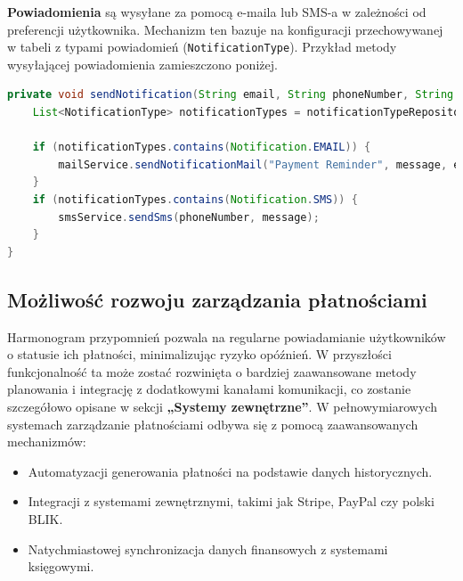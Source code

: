 \noindent \textbf{Powiadomienia} są wysyłane za pomocą e-maila lub SMS-a w zależności od preferencji użytkownika. Mechanizm ten bazuje na konfiguracji przechowywanej w tabeli z typami powiadomień (\texttt{NotificationType}).
Przykład metody wysyłającej powiadomienia zamieszczono poniżej.
\begin{lstlisting}[language=Java, style=JavaStyle, caption=Wysyłanie powiadomień]
private void sendNotification(String email, String phoneNumber, String message) {
    List<NotificationType> notificationTypes = notificationTypeRepository.findByUserEmail(email);

    if (notificationTypes.contains(Notification.EMAIL)) {
        mailService.sendNotificationMail("Payment Reminder", message, email);
    }
    if (notificationTypes.contains(Notification.SMS)) {
        smsService.sendSms(phoneNumber, message);
    }
}
\end{lstlisting}

\subsection{Możliwość rozwoju zarządzania płatnościami}
Harmonogram przypomnień pozwala na regularne powiadamianie użytkowników o statusie ich płatności, minimalizując ryzyko opóźnień. W przyszłości funkcjonalność ta może zostać rozwinięta o bardziej zaawansowane metody planowania i integrację z dodatkowymi kanałami komunikacji, co zostanie szczegółowo opisane w sekcji \textbf{„Systemy zewnętrzne”}. W pełnowymiarowych systemach zarządzanie płatnościami odbywa się z pomocą zaawansowanych mechanizmów:
\begin{itemize}
    \item Automatyzacji generowania płatności na podstawie danych historycznych.
    \item Integracji z systemami zewnętrznymi, takimi jak Stripe, PayPal czy polski BLIK.
    \item Natychmiastowej synchronizacja danych finansowych z systemami księgowymi.
\end{itemize}



